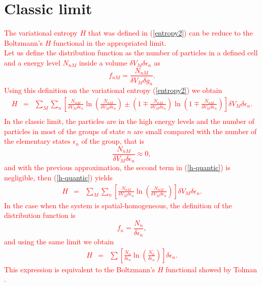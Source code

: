 \documentclass{article}
\begin{document}
\section{Classic limit}
\textcolor{red}{The variational entropy $H$ that was defined in (\ref{entropy2}) can be reduce to the Boltzmann's $H$ functional in the appropriated limit.\\
Let us define the distribution function as the number of particles in a defined cell and a energy level $N_{nM}$ inside a volume $\delta V_M \delta \epsilon_n$ as
\begin{equation}
    f_{nM}=\frac{N_{nM}}{\delta V_M \delta g_{n} }.
\end{equation}
Using this definition on the variational entropy (\ref{entropy2}) we obtain
\begin{eqnarray}
    H&=& \sum_M \sum_n
    \left[  
           \frac{N_{nM}}{\delta V_M \delta \epsilon_{n}} \ln 
           \left( 
                  \frac{N_{nM}}{\delta V_M \delta \epsilon_{n}}
           \right)\pm 
           \left(  
                  1\mp \frac{N_{nM}}{\delta V_M \delta \epsilon_{n}}
           \right) \ln 
           \left(  
                   1\mp \frac{N_{nM}}{\delta V_M \delta \epsilon_{n}}
           \right)
    \right]\delta V_M \delta \epsilon_{n}. \nonumber \\
    \label{h-quantic} 
\end{eqnarray}
In the classic limit, the particles are in the high energy levels and the number of particles  in most of the groups of state $n$ are small compared with the number of the elementary states $\epsilon_n$ of the group, that is
\begin{equation}
    \frac{N_{nM}}{\delta V_M \delta \epsilon_{n} } \approx 0,
\end{equation}
and with the previous approximation, the second term in (\ref{h-quantic}) is negligible, then (\ref{h-quantic}) yields
\begin{eqnarray}
    H&=& \sum_M \sum_n
    \left[  
           \frac{N_{nM}}{\delta V_M \delta \epsilon_{n}} \ln 
           \left( 
                  \frac{N_{nM}}{\delta V_M \delta \epsilon_{n}}
           \right)
    \right]\delta V_M \delta \epsilon_{n}. \label{h-quantic2}
\end{eqnarray}
In the case when the system is spatial-homogeneous, the definition of the distribution function is 
\begin{equation}
    f_{n}=\frac{N_{n}}{ \delta \epsilon_{n} },
\end{equation}
and using the same limit we obtain
\begin{eqnarray}
    H&=& \sum
    \left[  
           \frac{N_{n}}{ \delta \epsilon_{n}} \ln 
           \left( 
                  \frac{N_{n}}{ \delta \epsilon_{n}}
           \right)
    \right] \delta \epsilon_{n}. \label{h-quantic4}
\end{eqnarray}
This expression is equivalent to the
Boltzmann's $H$ functional showed by Tolman
\cite{tolman}.}
\end{document}
